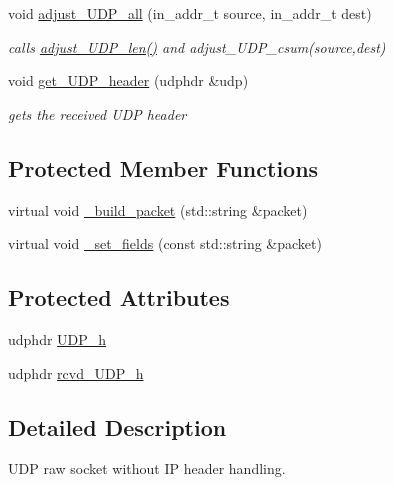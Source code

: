 \begin{CompactItemize}
void \hyperlink{classsocketpp_1_1UDP__RawSocket_4fe2e6b184ca8f8248a187df30e12fd2}{adjust\_\-UDP\_\-all} (in\_\-addr\_\-t source, in\_\-addr\_\-t dest)
\begin{CompactList}\small\item\em calls \hyperlink{classsocketpp_1_1UDP__RawSocket_1caa413cfe4f72d8c0aeccdcb10469b5}{adjust\_\-UDP\_\-len()} and adjust\_\-UDP\_\-csum(source,dest) \item\end{CompactList}\item 
void \hyperlink{classsocketpp_1_1UDP__RawSocket_597a30fc537dce06c85663add29defdc}{get\_\-UDP\_\-header} (udphdr \&udp)
\begin{CompactList}\small\item\em gets the received UDP header \item\end{CompactList}\end{CompactItemize}
\subsection*{Protected Member Functions}
\begin{CompactItemize}
\item 
virtual void \hyperlink{classsocketpp_1_1UDP__RawSocket_fe8cc7391c23dcf011f285b1605cad6b}{\_\-build\_\-packet} (std::string \&packet)
\item 
virtual void \hyperlink{classsocketpp_1_1UDP__RawSocket_a2dd7ab190a6730f9272eced4e648b50}{\_\-set\_\-fields} (const std::string \&packet)
\end{CompactItemize}
\subsection*{Protected Attributes}
\begin{CompactItemize}
\item 
udphdr \hyperlink{classsocketpp_1_1UDP__RawSocket_fbdcc519279aec772f575237ca25f783}{UDP\_\-h}
\item 
udphdr \hyperlink{classsocketpp_1_1UDP__RawSocket_9b21e1b520434f7b07d5afcc35ceb76c}{rcvd\_\-UDP\_\-h}
\end{CompactItemize}


\subsection{Detailed Description}
UDP raw socket without IP header handling. 

